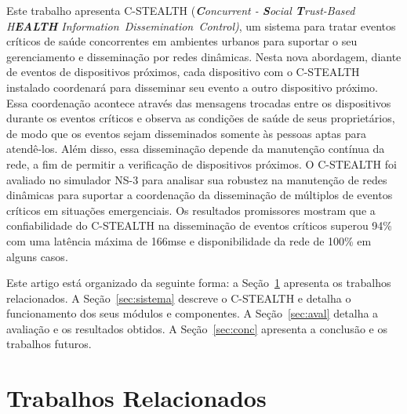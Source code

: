\documentclass[12pt]{article}
\newcommand{\as}[1]{\textcolor{blue}{{\bf #1}}}
\begin{document}



Este trabalho apresenta 
\mbox{C-STEALTH} (\textit{\textbf{C}oncurrent - \textbf{S}ocial \textbf{T}rust-Based H\textbf{EALTH} \mbox{Information Dissemination Control)}}, um sistema para 
tratar eventos críticos de saúde concorrentes
em ambientes urbanos para
suportar o seu gerenciamento e disseminação
por redes dinâmicas.
Nesta nova abordagem, 
diante
de eventos de dispositivos próximos, cada dispositivo com o \mbox{C-STEALTH} instalado coordenará para
disseminar seu evento
a outro dispositivo próximo. Essa coordenação acontece através das mensagens trocadas entre os dispositivos durante os eventos críticos e observa as condições de saúde de seus proprietários,
de modo que os eventos sejam disseminados somente às pessoas aptas para atendê-los. 
Além disso,
essa disseminação depende da manutenção contínua da rede, a fim de permitir a verificação de dispositivos próximos. O \mbox{C-STEALTH} foi avaliado no simulador NS-3 para analisar sua robustez na manutenção de redes dinâmicas para suportar a coordenação da disseminação de múltiplos de eventos críticos em situações emergenciais. Os resultados promissores mostram que a confiabilidade do \mbox{C-STEALTH} na disseminação de eventos críticos superou 94\% com uma latência máxima de 166mse e disponibilidade da rede de 100\% em alguns casos.


Este artigo está organizado da seguinte forma: a Seção~\ref{sec:trabRel} apresenta os trabalhos relacionados. A Seção~\ref{sec:sistema} descreve o C-STEALTH e detalha o funcionamento dos seus módulos e componentes. A Seção~\ref{sec:aval} detalha a avaliação e os resultados obtidos. A Seção~\ref{sec:conc} apresenta a conclusão e os trabalhos futuros.


\section{Trabalhos Relacionados}
\label{sec:trabRel}
\end{document}
